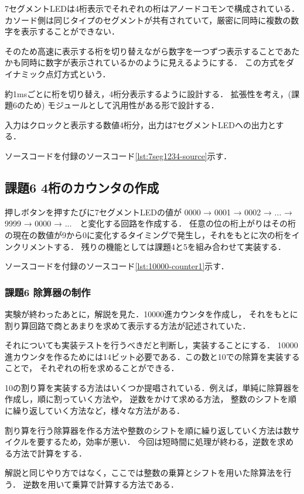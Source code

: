 7セグメントLEDは4桁表示でそれぞれの桁はアノードコモンで構成されている．
カソード側は同じタイプのセグメントが共有されていて，厳密に同時に複数の数字を表示することができない．

そのため高速に表示する桁を切り替えながら数字を一つずつ表示することであたかも同時に数字が表示されているかのように見えるようにする．
この方式をダイナミック点灯方式という．

約1msごとに桁を切り替え，4桁分表示するように設計する．
拡張性を考え，(課題6のため) モジュールとして汎用性がある形で設計する．

入力はクロックと表示する数値4桁分，出力は7セグメントLEDへの出力とする．

ソースコードを付録のソースコード\ref{lst:7seg1234-source}示す．

\subsection{課題6 4桁のカウンタの作成}
押しボタンを押すたびに7セグメントLEDの値が 0000 → 0001 → 0002 → ... → 9999 → 0000 → ...　と変化する回路を作成する．
任意の位の桁上がりはその桁の現在の数値が9から0に変化するタイミングで発生し，それをもとに次の桁をインクリメントする．
残りの機能としては課題4と5を組み合わせて実装する．

ソースコードを付録のソースコード\ref{lst:10000-counter1}示す．

\subsubsection{課題6 除算器の制作}
実験が終わったあとに，解説を見た．10000進カウンタを作成し，
それをもとに割り算回路で商とあまりを求めて表示する方法が記述されていた．

それについても実装テストを行うべきだと判断し，実装することにする．
10000進カウンタを作るためには14ビット必要である．この数と10での除算を実装することで，
それぞれの桁を求めることができる．

10の割り算を実装する方法はいくつか提唱されている．例えば，単純に除算器を作成し，順に割っていく方法や，
逆数をかけて求める方法，
整数のシフトを順に繰り返していく方法\cite{int-div-const-2003}など，様々な方法がある．

割り算を行う除算器を作る方法や整数のシフトを順に繰り返していく方法は数サイクルを要するため，効率が悪い．
今回は短時間に処理が終わる，逆数を求める方法で計算をする．

解説と同じやり方ではなく，ここでは整数の乗算とシフトを用いた除算法を行う．
逆数を用いて乗算で計算する方法である．

